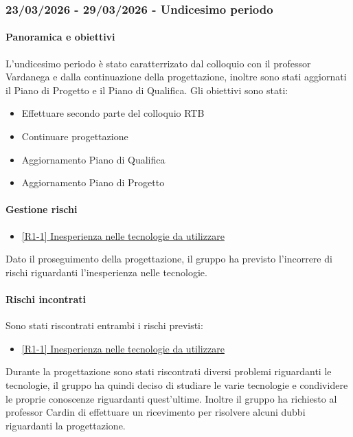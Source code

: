 \documentclass[a4paper,12pt]{article}
\begin{document}
        \subsubsection{23/03/2026 - 29/03/2026 - Undicesimo periodo}
            \paragraph{Panoramica e obiettivi}
            L'undicesimo periodo è stato caratterrizato dal colloquio con il professor Vardanega e dalla continuazione della progettazione, inoltre sono stati aggiornati il Piano di Progetto e il Piano di Qualifica.  Gli obiettivi sono stati:
            \begin{itemize}
                \item Effettuare secondo parte del colloquio RTB
                \item Continuare progettazione
                \item Aggiornamento Piano di Qualifica
                \item Aggiornamento Piano di Progetto
            \end{itemize}
            
            \paragraph{Gestione rischi}
                \begin{itemize}
                \item\hyperref[tab:r1]{[R1-1] Inesperienza nelle tecnologie da utilizzare}
                \end{itemize}
                Dato il proseguimento della progettazione, il gruppo ha previsto l'incorrere di rischi riguardanti l'inesperienza nelle tecnologie.
    
                \paragraph*{Rischi incontrati}
                Sono stati riscontrati entrambi i rischi previsti:
                \\
                \begin{itemize}
                    \item \hyperref[tab:r1]{[R1-1] Inesperienza nelle tecnologie da utilizzare}
                \end{itemize}
                Durante la progettazione sono stati riscontrati diversi problemi riguardanti le tecnologie, il gruppo ha quindi deciso di studiare le varie tecnologie e condividere le proprie conoscenze riguardanti quest'ultime.
                Inoltre il gruppo ha richiesto al professor Cardin di effettuare un ricevimento per risolvere alcuni dubbi riguardanti la progettazione.
                
\end{document}
